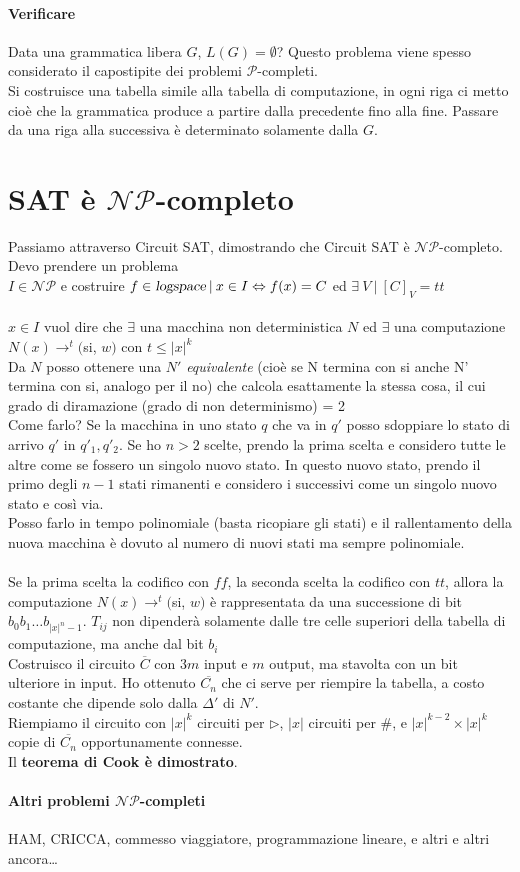\documentclass[10pt]{book}
\begin{document}
\paragraph{Verificare} Data una grammatica libera $G$, $L(G) = \emptyset$? Questo problema viene spesso considerato il capostipite dei problemi $\mathscr{P}$-completi.\\
Si costruisce una tabella simile alla tabella di computazione, in ogni riga ci metto  cioè che la grammatica produce a partire dalla precedente fino alla fine. Passare da una riga alla successiva è determinato solamente dalla $G$.
\section{SAT è $\mathscr{NP}$-completo}
Passiamo attraverso Circuit SAT, dimostrando che Circuit SAT è $\mathscr{NP}$-completo. Devo prendere un problema\\$I \in \mathscr{NP}$ e costruire $f\in\textsl{logspace}\:|\:x\in I\Leftrightarrow f(x) = C$ ed $\exists\:V\:|\:[C]_V = tt$\\\\
$x \in I$ vuol dire che $\exists$ una macchina non deterministica $N$ ed $\exists$ una computazione $N(x)\longrightarrow^t($si, $w)$ con $t\leq |x|^k$\\
Da $N$ posso ottenere una $N'$ \textit{equivalente} (cioè se N termina con si anche N' termina con si, analogo per il no) che calcola esattamente la stessa cosa, il cui grado di diramazione (grado di non determinismo) = 2\\
Come farlo? Se la macchina in uno stato $q$ che va in $q'$ posso sdoppiare lo stato di arrivo $q'$ in $q'_1, q'_2$. Se ho $n > 2$ scelte, prendo la prima scelta e considero tutte le altre come se fossero un singolo nuovo stato. In questo nuovo stato, prendo il primo degli $n-1$ stati rimanenti e considero i successivi come un singolo nuovo stato e così via.\\
Posso farlo in tempo polinomiale (basta ricopiare gli stati) e il rallentamento della nuova macchina è dovuto al numero di nuovi stati ma sempre polinomiale.\\\\
Se la prima scelta la codifico con $ff$, la seconda scelta la codifico con $tt$, allora la computazione $N(x)\longrightarrow^t($si, $w)$ è rappresentata da una successione di bit $b_0 b_1\ldots b_{|x|^n - 1}$. $T_{ij}$ non dipenderà solamente dalle tre celle superiori della tabella di computazione, ma anche dal bit $b_i$\\
Costruisco il circuito $\overline{C}$ con $3m$ input e $m$ output, ma stavolta con un bit ulteriore in input. Ho ottenuto $\overline{C_n}$ che ci serve per riempire la tabella, a costo costante che dipende solo dalla $\Delta'$ di $N'$.\\
Riempiamo il circuito con $|x|^k$ circuiti per $\triangleright$, $|x|$ circuiti per $\#$, e $|x|^{k-2}\times|x|^k$ copie di $\overline{C_n}$ opportunamente connesse.\\
Il \textbf{teorema di Cook è dimostrato}.
\paragraph{Altri problemi $\mathscr{NP}$-completi} HAM, CRICCA, commesso viaggiatore, programmazione lineare, e altri e altri ancora\ldots
\end{document}
